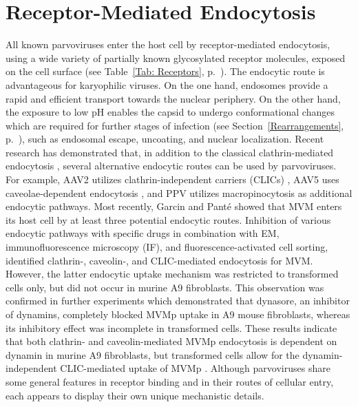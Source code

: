 \section{Receptor-Mediated Endocytosis}
\label{Endocytosis}
All known parvoviruses enter the host cell by receptor-mediated endocytosis, using a wide variety of partially known glycosylated receptor molecules, exposed on the cell surface \cite{pmid18406140} (see Table~\ref{Tab: Receptors}, p.~\pageref{Tab: Receptors}). The endocytic route is advantageous for karyophilic viruses. On the one hand, endosomes provide a rapid and efficient transport towards the nuclear periphery. On the other hand, the exposure to low pH enables the capsid to undergo conformational changes which are required for further stages of infection (see Section~\ref{Rearrangements}, p.~\pageref{Rearrangements}), such as endosomal escape, uncoating, and nuclear localization. Recent research has demonstrated that, in addition to the classical clathrin-mediated endocytosis \cite{pmid20484503, pmid10559355, pmid10644365}, several alternative endocytic routes can be used by parvoviruses. For example, AAV2 utilizes clathrin-independent carriers (CLICs) \cite{pmid22177561}, AAV5 uses caveolae-dependent endocytosis \cite{pmid19141440}, and PPV utilizes macropinocytosis \cite{pmid20484503} as additional endocytic pathways. Most recently, Garcin and Panté showed that MVM enters its host cell by at least three potential endocytic routes. Inhibition of various endocytic pathways with specific drugs in combination with EM, immunofluorescence microscopy (IF), and fluorescence-activated cell sorting, identified clathrin-, caveolin-, and CLIC-mediated endocytosis for MVM. However, the latter endocytic uptake mechanism was restricted to transformed cells only, but did not occur in murine A9 fibroblasts. This observation was confirmed in further experiments which demonstrated that dynasore, an inhibitor of dynamins, completely blocked MVMp uptake in A9 mouse fibroblasts, whereas its inhibitory effect was incomplete in transformed cells. These results indicate that both clathrin- and caveolin-mediated MVMp endocytosis is dependent on dynamin in murine A9 fibroblasts, but transformed cells allow for the dynamin-independent CLIC-mediated uptake of MVMp \cite{pmid25863880}. Although parvoviruses share some general features in receptor binding and in their routes of cellular entry, each appears to display their own unique mechanistic details.     

